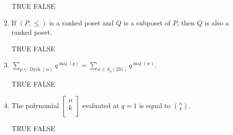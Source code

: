 \documentclass[11pt]{article}
\theoremstyle{definition}
\DeclareMathOperator{\inv}{inv}
\DeclareMathOperator{\Des}{Des}
\DeclareMathOperator{\Dyck}{Dyck}
\DeclareMathOperator{\maj}{maj}
\newcommand{\qbinom}[2]{
  \displaystyle \left[\begin{matrix}#1  \\#2  \\ \end{matrix}\right]}
\begin{document}
\begin{enumerate}
\begin{enumerate}[label=\text{(\alph*)}]
\smallskip

TRUE \qquad FALSE

\item If $(P,\leq)$ is a ranked poset and $Q$ is a subposet of $P$, then $Q$ is also a ranked poset.

\smallskip

TRUE \qquad FALSE

%
%

\item $\displaystyle \sum_{p\in\Dyck(n)}q^{\maj(p)}=\sum_{w\in S_n(231)}q^{\maj(w)}$.

\smallskip

TRUE \qquad FALSE

\item The polynomial $\qbinom{n}{k}$ evaluated at $q=1$ is equal to $\displaystyle \binom{n}{k}$.

\smallskip

TRUE \qquad FALSE
%
%
%

%
%

%
%

%
%

\end{enumerate}


\end{enumerate}
\end{document}
